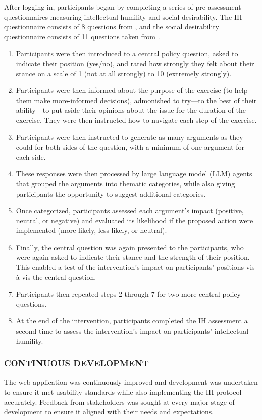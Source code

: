 \documentclass[journal]{IEEEtran}
\begin{document}
After logging in, participants began by completing a series of pre-assessment questionnaires measuring intellectual humility and social desirability. The IH questionnaire consists of 8 questions from \citep{general-intellectual-humility}, and the social desirability questionnaire consists of 11 questions taken from \citep{social-desirability}.

\begin{enumerate}
    \item Participants were then introduced to a central policy question, asked to indicate their position (yes/no), and rated how strongly they felt about their stance on a scale of 1 (not at all strongly) to 10 (extremely strongly).
    \item Participants were then informed about the purpose of the exercise (to help them make more-informed decisions), admonished to try---to the best of their ability---to put aside their opinions about the issue for the duration of the exercise. They were then instructed how to navigate each step of the exercise.
    \item Participants were then instructed to generate as many arguments as they could for both sides of the question, with a minimum of one argument for each side.
    \item These responses were then processed by large language model (LLM) agents that grouped the arguments into thematic categories, while also giving participants the opportunity to suggest additional categories.
    \item Once categorized, participants assessed each argument's impact (positive, neutral, or negative) and evaluated its likelihood if the proposed action were implemented (more likely, less likely, or neutral).
    \item Finally, the central question was again presented to the participants, who were again asked to indicate their stance and the strength of their position. This enabled a test of the intervention's impact on participants' positions vis-\`a-vis the central question.
    \item Participants then repeated steps 2 through 7 for two more central policy questions.
    \item At the end of the intervention, participants completed the IH assessment a second time to assess the intervention's impact on participants' intellectual humility.
\end{enumerate}

\subsubsection{CONTINUOUS DEVELOPMENT}
\label{section:continuous-development}
The web application was continuously improved and development was undertaken to ensure it met usability standards while also implementing the IH protocol accurately. Feedback from stakeholders was sought at every major stage of development to ensure it aligned with their needs and expectations.
\end{document}
